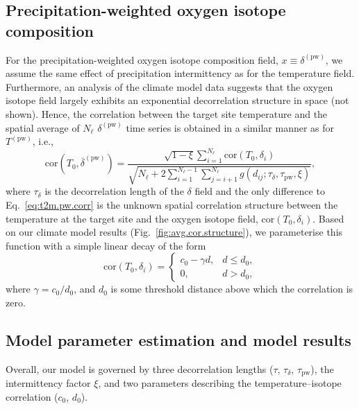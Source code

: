 \documentclass[cp, manuscript]{copernicus}
\begin{document}
\subsection{Precipitation-weighted oxygen isotope composition}
\label{app:concept.model.oxy.pw}

For the precipitation-weighted oxygen isotope composition field, $x \equiv
\delta^{\mathrm{(pw)}}$, we assume the same effect of precipitation
intermittency as for the temperature field. Furthermore, an analysis of the
climate model data suggests that the oxygen isotope field largely exhibits
an exponential decorrelation structure in space (not shown). Hence, the
correlation between the target site temperature and the spatial average of $N_{\ell}$
$\delta^{\mathrm{(pw)}}$ time series is obtained in a similar manner as for
$T^{\mathrm{(pw)}}$, i.e.,
%
\begin{equation}
\label{eq:oxy.pw.corr}
\mathrm{cor}\left(T_0,
  \overline{\delta}^{\mathrm{(pw)}}\right)=
\frac
{\sqrt{1-\xi}\sum_{i=1}^{N_{\ell}}\mathrm{cor}\left(T_0,\delta_i\right)}
{\sqrt{N_{\ell} + 2\sum_{i=1}^{N_{\ell}-1}\sum_{j=i+1}^{N_{\ell}}
  g(d_{ij}; \tau_{\delta}, \tau_{\mathrm{pw}}, \xi)}},
\end{equation}
%
where $\tau_{\delta}$ is the decorrelation length of the $\delta$ field and the
only difference to Eq.~\eqref{eq:t2m.pw.corr} is the unknown spatial
correlation structure between the temperature at the target site and the oxygen
isotope field, $\mathrm{cor}\left(T_0,\delta_i\right)$.  Based on our climate
model results (Fig.~\ref{fig:avg.cor.structure}), we parameterise this
function with a simple linear decay of the form
%
\begin{equation}
\label{eq:t2m.oxy.corr}
\mathrm{cor}\left(T_0,\delta_i\right)=
\begin{cases}
  c_0 - \gamma d, & d \le d_0,\\
  0, & d > d_0,
\end{cases}
\end{equation}
%
where $\gamma=c_0/d_0$, and $d_0$ is some threshold distance above which
the correlation is zero.

\subsection{Model parameter estimation and model results}
\label{app:concept.model.estimation}

Overall, our model is governed by three decorrelation lengths ($\tau$,
$\tau_{\delta}$, $\tau_{\mathrm{pw}}$), the intermittency factor $\xi$, and two
parameters describing the temperature--isotope correlation ($c_0$, $d_0$).
\end{document}
